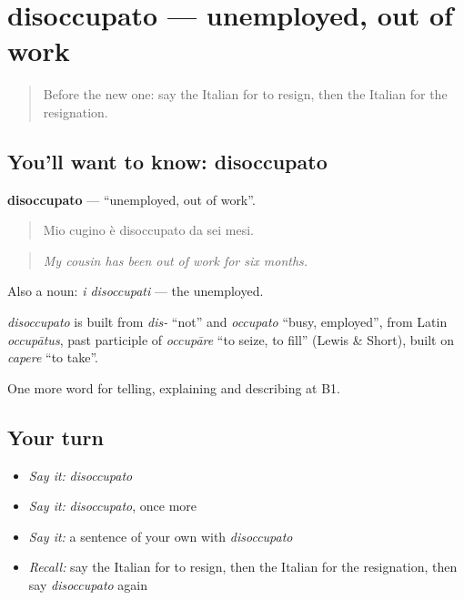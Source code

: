 \section[disoccupato]{disoccupato — unemployed, out of work}

\label{lesson:IT-C357-disoccupato}



\begin{quote}
Before the new one: say the Italian for to resign, then the Italian for the resignation.
\end{quote}

\subsection*{You'll want to know: disoccupato}
\textbf{disoccupato} — \textquotedblleft{}unemployed, out of work\textquotedblright{}.

\begin{quote}
Mio cugino è disoccupato da sei mesi.
\end{quote}

\begin{quote}
\emph{My cousin has been out of work for six months.}
\end{quote}

Also a noun: \emph{i disoccupati} — the unemployed.

\begin{cousinweb}
\emph{disoccupato} is built from \emph{dis-} \textquotedblleft{}not\textquotedblright{} and \emph{occupato} \textquotedblleft{}busy, employed\textquotedblright{}, from Latin \emph{occupātus}, past participle of \emph{occupāre} \textquotedblleft{}to seize, to fill\textquotedblright{} (Lewis \& Short), built on \emph{capere} \textquotedblleft{}to take\textquotedblright{}.
\end{cousinweb}

\begin{grammarlens}[title={What you've built}]
One more word for telling, explaining and describing at B1.
\end{grammarlens}

\subsection*{Your turn}
\begin{itemize}
\raggedright
  \item \emph{Say it:} \emph{disoccupato}
  \item \emph{Say it:} \emph{disoccupato}, once more
  \item \emph{Say it:} a sentence of your own with \emph{disoccupato}
  \item \emph{Recall:} say the Italian for to resign, then the Italian for the resignation, then say \emph{disoccupato} again
\end{itemize}

